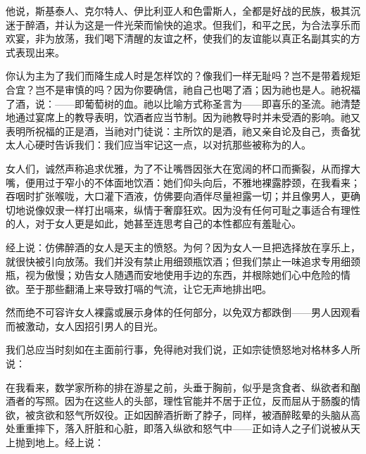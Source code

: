 他说，斯基泰人、克尔特人、伊比利亚人和色雷斯人，全都是好战的民族，极其沉迷于醉酒，并认为这是一件光荣而愉快的追求。但我们，和平之民，为合法享乐而欢宴，非为放荡，我们喝下清醒的友谊之杯，使我们的友谊能以真正名副其实的方式表现出来。\par

你认为主为了我们而降生成人时是怎样饮的？像我们一样无耻吗？岂不是带着规矩合宜？岂不是审慎的吗？因为你要确信，祂自己也喝了酒；因为祂也是人。祂祝福了酒，说：——即葡萄树的血。祂以比喻方式称圣言为——即喜乐的圣流。祂清楚地通过宴席上的教导表明，饮酒者应当节制。因为祂教导时并未受酒的影响。祂又表明所祝福的正是酒，当祂对门徒说：主所饮的是酒，祂又亲自论及自己，责备犹太人心硬时告诉我们：我们应当牢记这一点，以对抗那些被称为的人。\par

女人们，诚然声称追求优雅，为了不让嘴唇因张大在宽阔的杯口而撕裂，从而撑大嘴，便用过于窄小的不体面地饮酒：她们仰头向后，不雅地裸露脖颈，在我看来；吞咽时扩张喉咙，大口灌下酒液，仿佛要向酒伴尽量袒露一切；并且像男人，更确切地说像奴隶一样打出嗝来，纵情于奢靡狂欢。因为没有任何可耻之事适合有理性的人，对于女人更是如此，她甚至连思考自己的本性都应有羞耻心。\par

经上说：仿佛醉酒的女人是天主的愤怒。为何？因为女人一旦把选择放在享乐上，就很快被引向放荡。我们并没有禁止用细颈瓶饮酒；但我们禁止一味追求专用细颈瓶，视为傲慢；劝告女人随遇而安地使用手边的东西，并根除她们心中危险的情欲。至于那些翻涌上来导致打嗝的气流，让它无声地排出吧。\par

然而绝不可容许女人裸露或展示身体的任何部分，以免双方都跌倒——男人因观看而被激动，女人因招引男人的目光。\par

我们总应当时刻如在主面前行事，免得祂对我们说，正如宗徒愤怒地对格林多人所说：\par

在我看来，数学家所称的排在游星之前，头垂于胸前，似乎是贪食者、纵欲者和酗酒者的写照。因为在这些人的头部，理性官能并不居于正位，反而屈从于肠腹的情欲，被贪欲和怒气所奴役。正如因醉酒折断了脖子，同样，被酒醉眩晕的头脑从高处重重摔下，落入肝脏和心脏，即落入纵欲和怒气中——正如诗人之子们说被从天上抛到地上。经上说：\par

